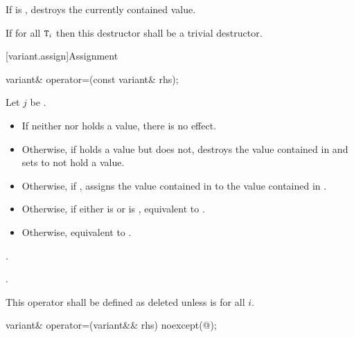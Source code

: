 \begin{itemdescr}
\pnum
\effects
If  is ,
destroys the currently contained value.

\pnum
\remarks
If  for all $\texttt{T}_i$
then this destructor shall be a trivial destructor.
\end{itemdescr}

[variant.assign]{Assignment}

%
\begin{itemdecl}
variant& operator=(const variant& rhs);
\end{itemdecl}

\begin{itemdescr}
\pnum
Let $j$ be .

\pnum
\effects
\begin{itemize}
\item
If neither  nor  holds a value, there is no effect.
\item
Otherwise, if  holds a value but  does not, destroys the value
contained in  and sets  to not hold a value.
\item
Otherwise, if , assigns the value contained in 
to the value contained in .
\item
Otherwise, if either 
is  or
 is ,
equivalent to .
\item
Otherwise, equivalent to .
\end{itemize}

\pnum
\returns {}.

\pnum
\postconditions {}.

\pnum
\remarks
This operator shall be defined as deleted unless
is  for all $i$.
\end{itemdescr}

%
\begin{itemdecl}
variant& operator=(variant&& rhs) noexcept(@\seebelow@);
\end{itemdecl}

